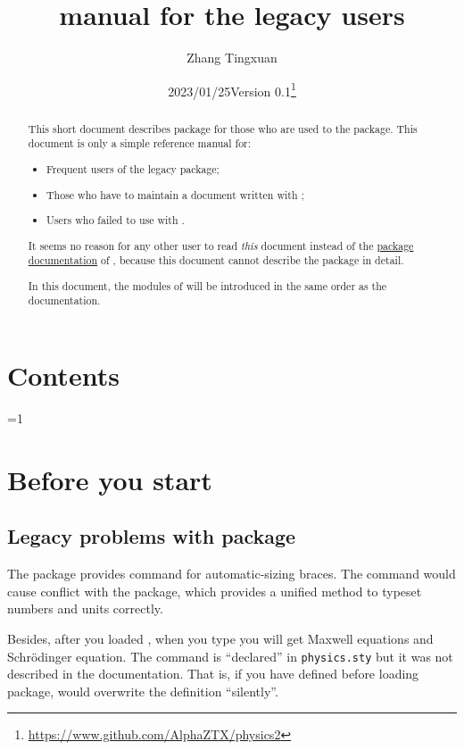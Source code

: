 \documentclass[11pt,letterpaper]{article}
\title{\pkg{physics2} manual for the legacy \pkg{physics} users}
\author{Zhang Tingxuan}
\date{2023/01/25\quad Version 0.1\thanks{%
  \url{https://www.github.com/AlphaZTX/physics2}}}
\begin{document}
\maketitle

\begin{abstract}
This short document describes  package for those who are
used to the  package. This document is only a simple reference
manual for:
\begin{itemize}
\item Frequent users of the legacy  package;
\item Those who have to maintain a document written with ;
\item Users who failed to use  with .
\end{itemize}
It seems no reason for any other user to read \emph{this} document instead of
the \hyperref{./physics2.pdf}{}{}{package documentation} of ,
because this document cannot describe the package in detail.

In this document, the modules of  will be introduced in
the same order as the  documentation.
\end{abstract}

\section*{Contents}
\begin{multicols}{2}
\contentsonly
\end{multicols}
\ifnum\value{page}=1 \vfil\clearpage\fi

\section{Before you start}
\subsection{Legacy problems with  package}
\label{subsec:physics-legacy-problems}
The  package provides  command for automatic-sizing
braces. The  command would cause conflict with the 
package, which provides a unified method to typeset numbers and units
correctly.

Besides, after you loaded , when you type  you
will get Maxwell equations and Schrödinger equation. The 
command is ``declared'' in \texttt{physics.sty} but it was not described
in the documentation. That is, if you have defined  before
loading  package,  would overwrite the definition
``silently''.
\end{document}
